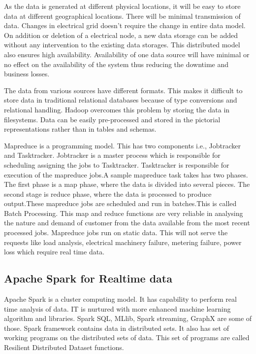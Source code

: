 \documentclass[sigconf]{acmart}
\begin{document}
As the data is generated at different physical locations, it will be easy to store data at different geographical locations. There will be minimal transmission of data. Changes in electrical grid doesn't require the change in entire data model. On addition or deletion of a electrical node, a new data storage can be added without any intervention to the existing data storages. This distributed model also ensures high availability. Availability of one data source will have minimal or no effect on the availability of the system thus reducing the downtime and business losses.

The data from various sources have different formats. This makes it difficult to store data in traditional relational databases because of type conversions and relational handling. Hadoop overcomes this problem by storing the data in filesystems. Data can be easily pre-processed and stored in the pictorial representations rather than in tables and schemas.

Mapreduce is a programming model. This has two components i.e., Jobtracker and Tasktracker. Jobtracker is a master process which is responsible for scheduling assigning the jobs to Tasktracker. Tasktracker is responsible for execution of the mapreduce jobs.A sample mapreduce\cite{tutorials} task takes has two phases. The first phase is a map phase, where the data is divided into several pieces. The second stage is reduce phase, where the data is processed to produce output.These mapreduce jobs are scheduled and run in batches.This is called Batch Processing.\cite{BigDataAnalyticsPlatformforSmartGrid2015} This map and reduce functions are very reliable in analysing the nature and demand of customer from the data available from the most recent processed jobs. Mapreduce jobs run on static data. This will not serve the requests like load analysis, electrical machinery failure, metering failure, power loss which require real time data. 

\subsection{Apache Spark for Realtime data}
Apache Spark\cite{Zaharia} is a cluster computing model. It has capability to perform real time analysis of data. IT is nurtured with more enhanced machine learning algorithm and libraries. Spark SQL, MLlib, Spark streaming, GraphX are some of those. Spark framework contains data in distributed sets. It also has set of working programs on the distributed sets of data. This set of programs are called Resilient Distributed Dataset functions\cite{Tu2016}.
\end{document}
